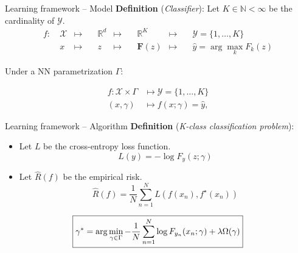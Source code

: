 
\begin{frame}{Learning framework -- Model}
	\textbf{Definition} (\textit{Classifier}): Let $K \in \mathbb{N} < \infty$ be the cardinality of $\mathcal{Y}$.
	$$
	\begin{aligned}
	f:\ & \mathcal{X} & \longmapsto & \quad \mathbb{R}^d & \longmapsto & \quad \mathbb{R}^K & \longmapsto & \quad \mathcal{Y} = \{1, \dots, K\} \\
		& x           & \longmapsto & \quad z & \longmapsto & \quad \bm{F}(z)    & \longmapsto & \quad \hat{y} = \arg \max_{k} F_k(z)
	\end{aligned}
	$$

	Under a NN parametrization $\Gamma$:


	$$
        \begin{aligned}
        f: \mathcal{X} \times \Gamma & \longmapsto \mathcal{Y} = \{1, \dots, K \} \\
        (x, \gamma) & \longmapsto f(x; \gamma) = \hat{y},
        \end{aligned}
    $$
\end{frame}


\begin{frame}{Learning framework -- Algorithm}
	\textbf{Definition} (\textit{K-class classification problem}):
	\begin{itemize}
		\item Let $L$ be the cross-entropy loss function.
		$$
		L(y) = - \log F_y(z; \gamma)
		$$
		\item Let $\hat{R}(f)$ be the empirical risk.
		$$
		\hat{R}(f)=\frac{1}{N}\sum_{n=1}^{N}L(f(x_{n}),f^{\star}(x_{n}))
		$$
	\end{itemize}

	$$
	\textcolor{black}{
        \boxed{
            \gamma^* = \arg \min_{\gamma \in \Gamma} - \frac{1}{N}\sum_{n=1}^{N} \log F_{y_n}(x_n; \gamma) + \lambda \Omega(\gamma)
        }
    }
	$$
\end{frame}

\begin{frame}
    \centering
    \Huge{\insertsection}  %
\end{frame}

